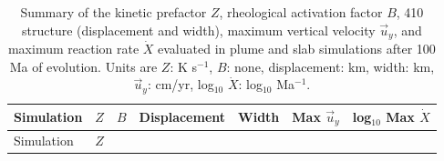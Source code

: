 \documentclass[draft,linenumbers]{agujournal2019}
\newcounter{none}
\begin{document}
\clearpage

\begin{longtable}[]{@{}
  >{\raggedright\arraybackslash}p{}
  >{\raggedleft\arraybackslash}p{}
  >{\raggedleft\arraybackslash}p{}
  >{\raggedleft\arraybackslash}p{}
  >{\raggedleft\arraybackslash}p{}
  >{\raggedleft\arraybackslash}p{}
  >{\raggedleft\arraybackslash}p{}@{}}
\caption{Summary of the kinetic prefactor \(Z\), rheological activation
factor \(B\), 410 structure (displacement and width), maximum vertical
velocity \(\vec{u}_y\), and maximum reaction rate \(\dot{X}\) evaluated
in plume and slab simulations after 100 Ma of evolution. Units are
\(Z\): K s\(^{-1}\), \(B\): none, displacement: km, width: km,
\(\vec{u}_y\): cm/yr, log\(_{10}\) \(\dot{X}\): log\(_{10}\)
Ma\(^{-1}\).}\label{tbl:depth-profile-summary}\tabularnewline
\toprule\noalign{}
\begin{minipage}[b]{\linewidth}\raggedright
Simulation
\end{minipage} & \begin{minipage}[b]{\linewidth}\raggedleft
\(Z\)
\end{minipage} & \begin{minipage}[b]{\linewidth}\raggedleft
\(B\)
\end{minipage} & \begin{minipage}[b]{\linewidth}\raggedleft
Displacement
\end{minipage} & \begin{minipage}[b]{\linewidth}\raggedleft
Width
\end{minipage} & \begin{minipage}[b]{\linewidth}\raggedleft
Max \(\vec{u}_y\)
\end{minipage} & \begin{minipage}[b]{\linewidth}\raggedleft
log\(_{10}\) Max \(\dot{X}\)
\end{minipage} \\
\midrule\noalign{}
\endfirsthead
\toprule\noalign{}
\begin{minipage}[b]{\linewidth}\raggedright
Simulation
\end{minipage} & \begin{minipage}[b]{\linewidth}\raggedleft
\(Z\)
\end{minipage} & \begin{minipage}[b]{\linewidth}\raggedleft

\end{minipage}
\end{longtable}
\end{document}
